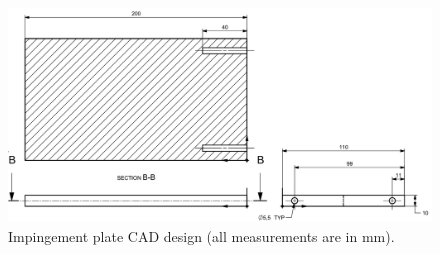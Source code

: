 \begin{figure}[!tbh] 
	\centering
	\includegraphics[width=1\textwidth]{plate_draw.png} 
	\caption{Impingement plate CAD design (all measurements are in mm).}
	\label{fig:plate_draw}
\end{figure}

\newpage

